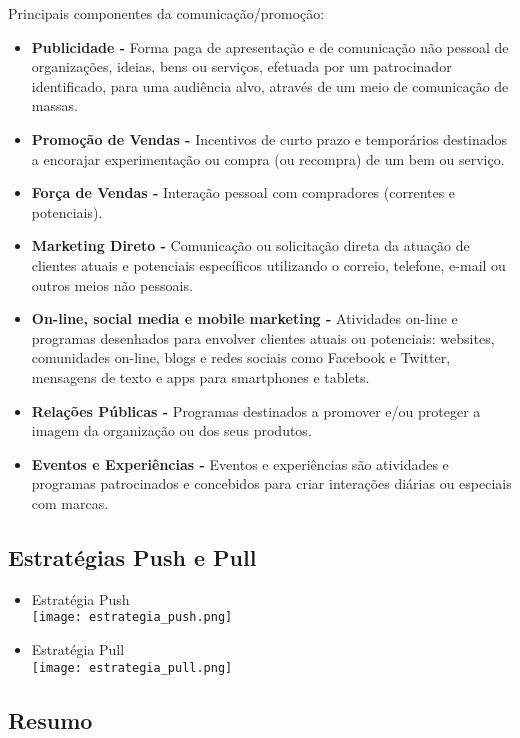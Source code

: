\documentclass[11pt]{article}
\begin{document}
Principais componentes da comunicação/promoção:
\begin{itemize}[topsep=0pt]
    \item \textbf{Publicidade -} Forma paga de apresentação e de comunicação não pessoal de organizações, ideias, bens ou serviços, efetuada por um patrocinador identificado, para uma audiência alvo, através de um meio de comunicação de massas.
    \item \textbf{Promoção de Vendas -} Incentivos de curto prazo e temporários destinados a encorajar experimentação ou compra (ou recompra) de um bem ou serviço.
    \item \textbf{Força de Vendas -} Interação pessoal com compradores (correntes e potenciais).
    \item \textbf{Marketing Direto -} Comunicação ou solicitação direta da atuação de clientes atuais e potenciais específicos utilizando o correio, telefone, e-mail ou outros meios não pessoais.
    \item \textbf{On-line, social media e mobile marketing -} Atividades on-line e programas desenhados para envolver clientes atuais ou potenciais: websites, comunidades on-line, blogs e redes sociais como Facebook e Twitter, mensagens de texto e apps para smartphones e tablets.
    \item \textbf{Relações Públicas -} Programas destinados a promover e/ou proteger a imagem da organização ou dos seus produtos.
    \item \textbf{Eventos e Experiências -} Eventos e experiências são atividades e programas patrocinados e concebidos para criar interações diárias ou especiais com marcas.
\end{itemize}

\subsection*{Estratégias Push e Pull}

\begin{itemize}[topsep=0pt,itemsep=0pt]
    \item Estratégia Push \\
          \texttt{[image: estrategia\_push.png]}
    \item Estratégia Pull \\[5pt]
          \texttt{[image: estrategia\_pull.png]}
\end{itemize}

\subsection*{Resumo}
\end{document}
